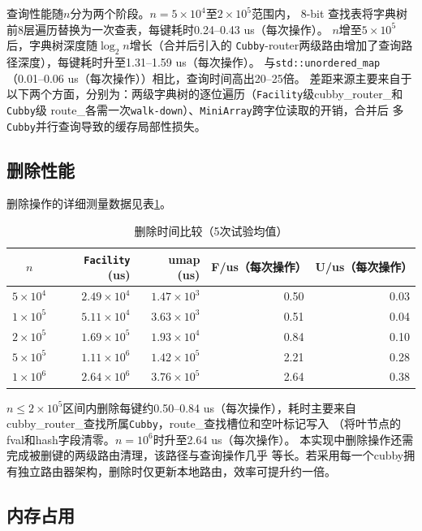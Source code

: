 \documentclass[
    type = bachelor,
    fontset = win,
    decl-page = true,
  ]{njuthesis}
\begin{document}
\noindent 查询性能随$n$分为两个阶段。$n=5\times10^4$至$2\times10^5$范围内，
8-bit 查找表将字典树前8层遍历替换为一次查表，每键耗时0.24--0.43 us（每次操作）。
$n$增至$5\times10^5$后，字典树深度随$\log_2 n$增长（合并后引入的
\texttt{Cubby}-router两级路由增加了查询路径深度），每键耗时升至1.31--1.59 us（每次操作）。
与\texttt{std::unordered\_map}（0.01--0.06 us（每次操作））相比，查询时间高出20--25倍。
差距来源主要来自于以下两个方面，分别为：两级字典树的逐位遍历（\texttt{Facility}级cubby\_router\_和\texttt{Cubby}级
route\_各需一次\texttt{walk-down}）、\texttt{MiniArray}跨字位读取的开销，合并后
多\texttt{Cubby}并行查询导致的缓存局部性损失。

\subsection{删除性能}

删除操作的详细测量数据见表\ref{tab:delete}。

\begin{table}[H]
\centering
\begin{tabular}{c|r|r|r|r}
\toprule
$n$ & \texttt{Facility} (us) & umap (us) & F/us（每次操作） & U/us（每次操作） \\
\midrule
$5\times10^4$ & $2.49\times 10^4$ & $1.47\times 10^3$ & 0.50 & 0.03 \\
$1\times10^5$ & $5.11\times 10^4$ & $3.63\times 10^3$ & 0.51 & 0.04 \\
$2\times10^5$ & $1.69\times 10^5$ & $1.93\times 10^4$ & 0.84 & 0.10 \\
$5\times10^5$ & $1.11\times 10^6$ & $1.42\times 10^5$ & 2.21 & 0.28 \\
$1\times10^6$ & $2.64\times 10^6$ & $3.76\times 10^5$ & 2.64 & 0.38 \\
\bottomrule
\end{tabular}
\caption{删除时间比较（5次试验均值）}
\label{tab:delete}
\end{table}

$n\leq 2\times10^5$区间内删除每键约0.50--0.84 us（每次操作），耗时主要来自
cubby\_router\_查找所属\texttt{Cubby}，route\_查找槽位和空叶标记写入
（将叶节点的fval和hash字段清零。$n=10^6$时升至2.64 us（每次操作）。
本实现中删除操作还需完成被删键的两级路由清理，该路径与查询操作几乎
等长。若采用每一个cubby拥有独立路由器架构，删除时仅更新本地路由，效率可提升约一倍。

\subsection{内存占用}
\end{document}
